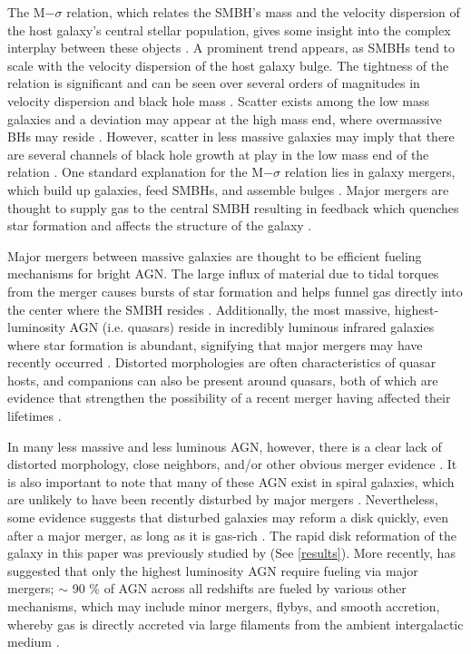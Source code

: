 \documentclass[]{emulateapj}
\begin{document}
The M$-\sigma$ relation, which relates the SMBH's mass and the velocity dispersion of the host galaxy's central stellar population, gives some insight into the complex interplay between these objects \citep{Ferrarese2000,Gebhardt2000}. A prominent trend appears, as SMBHs tend to scale with the velocity dispersion of the host galaxy bulge. The tightness of the relation is significant and can be seen over several orders of magnitudes in velocity dispersion and black hole mass \citep[e.g.][]{Merritt2001,Tremaine2002,Graham2011,Mcconnell2013}. Scatter exists among the low mass galaxies and a deviation may appear at the high mass end, where overmassive BHs may reside \citep{VanDenBosch2007,Moster2010,Natarajan2011,Emsellem2011,Dubois2015}. However, scatter in less massive galaxies may imply that there are several channels of black hole growth at play in the low mass end of the relation \citep{Micic2007,Volonteri2009,Reines2013,Graham2014}. One standard explanation for the M$-\sigma$ relation lies in galaxy mergers, which build up galaxies, feed SMBHs, and assemble bulges \citep[e.g.][]{DiMatteo2005,Shen2008}. Major mergers are thought to supply gas to the central SMBH resulting in feedback which quenches star formation and affects the structure of the galaxy \citep{Schawinski2010}. 

Major mergers between massive galaxies are thought to be efficient fueling mechanisms for bright AGN. The large influx of material due to tidal torques from the merger causes bursts of star formation and helps funnel gas directly into the center where the SMBH resides \citep[e.g.][]{Richards2006,Reddy2008,Hopkins2010}. Additionally, the most massive, highest-luminosity AGN (i.e. quasars) reside in incredibly luminous infrared galaxies where star formation is abundant, signifying that major mergers may have recently occurred \citep{Treister2012}. Distorted morphologies are often characteristics of quasar hosts, and companions can also be present around quasars, both of which are evidence that strengthen the possibility of a recent merger having affected their lifetimes \citep{Ellison2010}. 

In many less massive and less luminous AGN, however, there is a clear lack of distorted morphology, close neighbors, and/or other obvious merger evidence \citep{Ryan2007,Schawinski2011,Ellison2013,Hicks2013}. It is also important to note that many of these AGN exist in spiral galaxies, which are unlikely to have been recently disturbed by major mergers \citep{Schawinski2011,Kocevski2011}. Nevertheless, some evidence suggests that disturbed galaxies may reform a disk quickly, even after a major merger, as long as it is gas-rich \citep{vanGorkom1997}. The rapid disk reformation of the galaxy in this paper was previously studied by \cite{Governato2009} (See \ref{results}). More recently, \cite{Treister2012} has suggested that only the highest luminosity AGN require fueling via major mergers; $\sim$ 90 $\%$ of AGN across all redshifts are fueled by various other mechanisms, which may include minor mergers, flybys, and smooth accretion, whereby gas is directly accreted via large filaments from the ambient intergalactic medium \citep{Cox2006,Bellovary2013,Sinha2012,Dubois2012,DiMatteo2016}.
\end{document}
